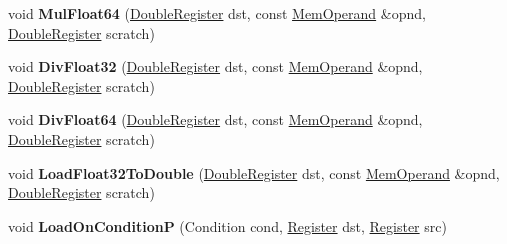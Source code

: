 \begin{DoxyCompactItemize}
\item 
\mbox{\label{classv8_1_1internal_1_1TurboAssembler_aed28f7f36eb3623c3fdce8d5b9a067c0}} 
void {\bfseries Mul\+Float64} (\mbox{\hyperlink{classv8_1_1internal_1_1DoubleRegister}{Double\+Register}} dst, const \mbox{\hyperlink{classv8_1_1internal_1_1MemOperand}{Mem\+Operand}} \&opnd, \mbox{\hyperlink{classv8_1_1internal_1_1DoubleRegister}{Double\+Register}} scratch)
\item 
\mbox{\label{classv8_1_1internal_1_1TurboAssembler_aa195654f996dc8a63d38f2e3717e96cf}} 
void {\bfseries Div\+Float32} (\mbox{\hyperlink{classv8_1_1internal_1_1DoubleRegister}{Double\+Register}} dst, const \mbox{\hyperlink{classv8_1_1internal_1_1MemOperand}{Mem\+Operand}} \&opnd, \mbox{\hyperlink{classv8_1_1internal_1_1DoubleRegister}{Double\+Register}} scratch)
\item 
\mbox{\label{classv8_1_1internal_1_1TurboAssembler_a9f18fb9fa877fbdc4a7a94f1142588fc}} 
void {\bfseries Div\+Float64} (\mbox{\hyperlink{classv8_1_1internal_1_1DoubleRegister}{Double\+Register}} dst, const \mbox{\hyperlink{classv8_1_1internal_1_1MemOperand}{Mem\+Operand}} \&opnd, \mbox{\hyperlink{classv8_1_1internal_1_1DoubleRegister}{Double\+Register}} scratch)
\item 
\mbox{\label{classv8_1_1internal_1_1TurboAssembler_a7c0113d2c0fcf15921c16cac849e98b7}} 
void {\bfseries Load\+Float32\+To\+Double} (\mbox{\hyperlink{classv8_1_1internal_1_1DoubleRegister}{Double\+Register}} dst, const \mbox{\hyperlink{classv8_1_1internal_1_1MemOperand}{Mem\+Operand}} \&opnd, \mbox{\hyperlink{classv8_1_1internal_1_1DoubleRegister}{Double\+Register}} scratch)
\item 
\mbox{\label{classv8_1_1internal_1_1TurboAssembler_a0e48b1226449567ac5a33503077cf1ce}} 
void {\bfseries Load\+On\+ConditionP} (Condition cond, \mbox{\hyperlink{classv8_1_1internal_1_1Register}{Register}} dst, \mbox{\hyperlink{classv8_1_1internal_1_1Register}{Register}} src)
\item 
\mbox{\label{classv8_1_1internal_1_1TurboAssembler_ae0acc96810d89d74f5ec5b4e9ae09082}} 

\end{DoxyCompactItemize}
